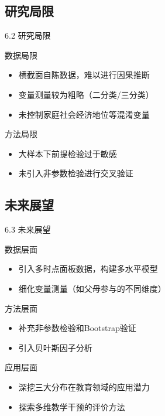 \documentclass{beamer}
\begin{document}
\subsection{研究局限}
\begin{frame}{6.2 研究局限}
    \begin{block}{数据局限}
        \begin{itemize}
            \item 横截面自陈数据，难以进行因果推断
            \item 变量测量较为粗略（二分类/三分类）
            \item 未控制家庭社会经济地位等混淆变量
        \end{itemize}
    \end{block}

    \vspace{0.3cm}

    \begin{block}{方法局限}
        \begin{itemize}
            \item 大样本下前提检验过于敏感
            \item 未引入非参数检验进行交叉验证
        \end{itemize}
    \end{block}
\end{frame}

\subsection{未来展望}
\begin{frame}{6.3 未来展望}
    \begin{block}{数据层面}
        \begin{itemize}
            \item 引入多时点面板数据，构建多水平模型
            \item 细化变量测量（如父母参与的不同维度）
        \end{itemize}
    \end{block}

    \vspace{0.3cm}

    \begin{block}{方法层面}
        \begin{itemize}
            \item 补充非参数检验和Bootstrap验证
            \item 引入贝叶斯因子分析
        \end{itemize}
    \end{block}

    \vspace{0.3cm}

    \begin{block}{应用层面}
        \begin{itemize}
            \item 深挖三大分布在教育领域的应用潜力
            \item 探索多维教学干预的评价方法
        \end{itemize}
    \end{block}
\end{frame}
\end{document}
